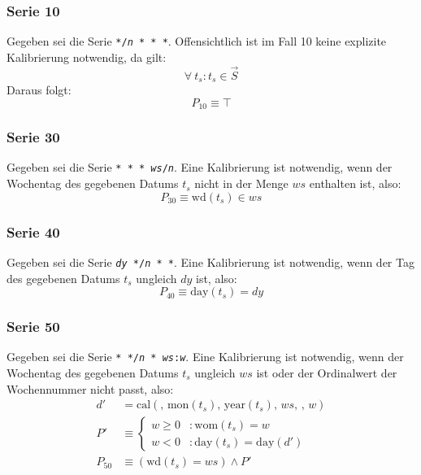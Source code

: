 \documentclass[a4paper]{article}
\newcommand*{\dayf}{\mathrm{day}}
\newcommand*{\monf}{\mathrm{mon}}
\newcommand*{\yearf}{\mathrm{year}}
\newcommand*{\wdf}{\mathrm{wd}}
\newcommand*{\womf}{\mathrm{wom}}
\newcommand*{\calf}{\mathrm{cal}}
\numberwithin{equation}{section}
\begin{document}
\subsubsection{Serie 10}
Gegeben sei die Serie \texttt{*/\textit{n} * * *}. Offensichtlich ist im Fall 10
keine explizite Kalibrierung notwendig, da gilt:
\begin{equation}\forall\ t_s : t_s \in \vec{S}\end{equation}
Daraus folgt:
\begin{equation}P_{10} \equiv \top\end{equation}

\subsubsection{Serie 30}
Gegeben sei die Serie \texttt{* * * \textit{ws}/\textit{n}}. Eine Kalibrierung
ist notwendig, wenn der Wochentag des gegebenen Datums $t_s$ nicht in der Menge
$ws$ enthalten ist, also:
\begin{equation}P_{30} \equiv \wdf(t_s) \in ws\end{equation}

\subsubsection{Serie 40}
Gegeben sei die Serie \texttt{\textit{dy} */\textit{n} * *}. Eine Kalibrierung
ist notwendig, wenn der Tag des gegebenen Datums $t_s$ ungleich $dy$ ist, also:
\begin{equation}P_{40} \equiv \dayf(t_s) = dy\end{equation}

\subsubsection{Serie 50}
Gegeben sei die Serie \texttt{* */\textit{n} * \textit{ws}:\textit{w}}. Eine
Kalibrierung ist notwendig, wenn der Wochentag des gegebenen Datums $t_s$
ungleich $ws$ ist oder der Ordinalwert der Wochennummer nicht passt, also:
\begin{equation}
\begin{split}
  d' & = \calf(,\,\monf(t_s),\,\yearf(t_s),\,ws,\,,\,w) \\
  P' & \equiv \left\{\begin{array}{ll}
      w \ge 0 & : \womf(t_s) = w \\
      w < 0 & : \dayf(t_s) = \dayf(d')
    \end{array}\right. \\
  P_{50} & \equiv (\wdf(t_s) = ws) \wedge P'
\end{split}
\end{equation}
\end{document}
